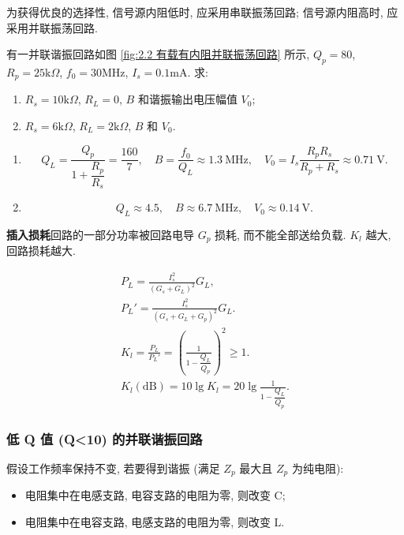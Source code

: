 为获得优良的选择性, 信号源内阻低时, 应采用串联振荡回路; 信号源内阻高时, 应采用并联振荡回路.

\begin{exampleprob}
    有一并联谐振回路如图 \ref{fig:2.2 有载有内阻并联振荡回路} 所示, $Q_p=80$, $R_p=25\mathrm{k}\Omega$, $f_0=30$MHz, $I_s=0.1$mA. 求:

    \begin{enumerate}
        \item $R_s=10\mathrm{k}\Omega$, $R_L=0$, $B$ 和谐振输出电压幅值 $V_0$;
        \item $R_s=6\mathrm{k}\Omega$, $R_L=2\mathrm{k}\Omega$, $B$ 和 $V_0$.
    \end{enumerate}

    \begin{solution}
        \begin{enumerate}
            \item \begin{equation*}
                      Q_L=\frac{Q_p}{1+\dfrac{R_p}{R_s}}=\frac{160}{7},\quad B=\frac{f_0}{Q_L}\approx 1.3\ \mathrm{MHz},\quad V_0=I_s\frac{R_pR_s}{R_p+R_s}\approx 0.71\ \mathrm{V}.
                  \end{equation*}
            \item \begin{equation*}
                      Q_L\approx 4.5,\quad B\approx 6.7\ \mathrm{MHz},\quad V_0\approx 0.14\ \mathrm{V}.
                  \end{equation*}
        \end{enumerate}
    \end{solution}
\end{exampleprob}

\textbf{插入损耗}\quad 回路的一部分功率被回路电导 $G_p$ 损耗, 而不能全部送给负载. $K_l$ 越大, 回路损耗越大.

\begin{gather}
    P_L=\frac{I_s^2}{(G_s+G_L)^2}G_L, \\
    P_L'=\frac{I_s^2}{(G_s+G_L+G_p)^2}G_L. \\
    K_l=\frac{P_L}{P_L'}=\left(\frac{1}{1-\dfrac{Q_L}{Q_p}}\right)^2\geq 1. \\
    K_l(\mathrm{dB})=10\lg K_l=20\lg\frac{1}{1-\dfrac{Q_L}{Q_p}}.
\end{gather}

\subsubsection{低 Q 值 (Q<10) 的并联谐振回路}

假设工作频率保持不变, 若要得到谐振 (满足 $Z_p$ 最大且 $Z_p$ 为纯电阻):

\begin{itemize}
    \item 电阻集中在电感支路, 电容支路的电阻为零, 则改变 C;
    \item 电阻集中在电容支路, 电感支路的电阻为零, 则改变 L.
\end{itemize}
